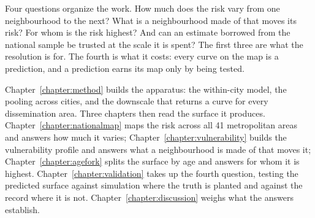 Four questions organize the work. How much does the risk vary from
one neighbourhood to the next? What is a neighbourhood made of that
moves its risk? For whom is the risk highest? And can an estimate
borrowed from the national sample be trusted at the scale it is
spent? The first three are what the resolution is for. The fourth is
what it costs: every curve on the map is a prediction, and a
prediction earns its map only by being tested.

Chapter~\ref{chapter:method} builds the apparatus: the within-city
model, the pooling across cities, and the downscale that returns a
curve for every dissemination area. Three chapters then read the
surface it produces. Chapter~\ref{chapter:nationalmap} maps the risk
across all 41 metropolitan areas and answers how much it varies;
Chapter~\ref{chapter:vulnerability} builds the vulnerability profile
and answers what a neighbourhood is made of that moves it;
Chapter~\ref{chapter:agefork} splits the surface by age and answers
for whom it is highest. Chapter~\ref{chapter:validation} takes up the
fourth question, testing the predicted surface against simulation
where the truth is planted and against the record where it is not.
Chapter~\ref{chapter:discussion} weighs what the answers establish.